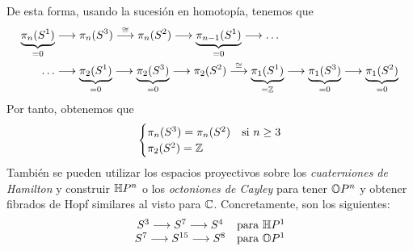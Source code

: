 \begin{enumerate}
De esta forma, usando la sucesión en homotopía, tenemos que 
\begin{align*}
\underbrace{\homot{n}{S^1}}_{\text{=0}} &\longrightarrow \homot{n}{S^3} \stackrel{\cong}{\longrightarrow} \homot{n}{S^2} \longrightarrow \underbrace{\homot{n-1}{S^1}}_{\text{=0}} \longrightarrow \dots \\ 
\dots &\longrightarrow \underbrace{\homot{2}{S^1}}_{\text{=0}} \longrightarrow \underbrace{\homot{2}{S^3}}_{\text{=0}} \longrightarrow \homot{2}{S^2} \stackrel{\cong}{\longrightarrow} \underbrace{\homot{1}{S^1}}_{\text{=}\bb{Z}} \longrightarrow \underbrace{\homot{1}{S^3}}_{\text{=0}} \longrightarrow \underbrace{\homot{1}{S^2}}_{\text{=0}}
\end{align*}
Por tanto, obtenemos que
\[
\begin{cases}
\pi_{n}(S^3) = \pi_{n}(S^2) & \text{si } n \geq 3 \\
\pi_{2}(S^2) = \mathbb{Z}
\end{cases}
\]
También se pueden utilizar los espacios proyectivos sobre los \textit{cuaterniones de Hamilton} y construir $\mathbb{H}P^n$ o los \textit{octoniones de Cayley} para tener $\mathbb{O}P^n$ y obtener fibrados de Hopf similares al visto para  $\mathbb{C}$. Concretamente, son los siguientes:
\[
\begin{matrix}
S^3 \longrightarrow S^7 \longrightarrow S^4 & \text{para } \bb{H}P^1 \\
S^7 \longrightarrow S^{15} \longrightarrow S^8 & \text{para } \bb{O}P^1
\end{matrix}
\]
\end{enumerate}

\newpage
\mbox{}
\thispagestyle{empty}